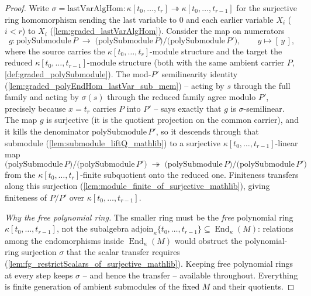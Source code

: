 \begin{proof}
    \leanok
  Write \(\sigma = \mathrm{lastVarAlgHom} : \kappa[t_0, \dots, t_r]
  \twoheadrightarrow \kappa[t_0, \dots, t_{r-1}]\) for the surjective ring
  homomorphism sending the last variable to \(0\) and each earlier variable \(X_i\)
  (\(i < r\)) to \(X_i\) (\cref{lem:graded_lastVarAlgHom}). Consider the map on numerators
  \[
    g : \mathrm{polySubmodule}\,P \;\longrightarrow\;
      \bigl(\mathrm{polySubmodule}\,P\bigr)\big/
        \bigl(\mathrm{polySubmodule}\,P'\bigr), \qquad y \longmapsto [\,y\,],
  \]
  where the source carries the \(\kappa[t_0, \dots, t_r]\)-module structure and the
  target the reduced \(\kappa[t_0, \dots, t_{r-1}]\)-module structure (both with the
  same ambient carrier \(P\), \cref{def:graded_polySubmodule}). The mod-\(P'\)
  semilinearity identity (\cref{lem:graded_polyEndHom_lastVar_sub_mem}) -- acting by
  \(s\) through the full family and acting by \(\sigma(s)\) through the reduced family
  agree modulo \(P'\), precisely because \(x = t_r\) carries \(P\) into \(P'\) --
  says exactly that \(g\) is \(\sigma\)-semilinear. The map \(g\) is surjective (it is
  the quotient projection on the common carrier), and it kills the denominator
  \(\mathrm{polySubmodule}\,P'\), so it descends through that submodule
  (\cref{lem:submodule_liftQ_mathlib}) to a surjective
  \(\kappa[t_0, \dots, t_{r-1}]\)-linear map
  \[
    \bigl(\mathrm{polySubmodule}\,P\bigr)\big/\bigl(\mathrm{polySubmodule}\,P'\bigr)
      \;\twoheadrightarrow\;
    \bigl(\mathrm{polySubmodule}\,P\bigr)\big/\bigl(\mathrm{polySubmodule}\,P'\bigr)
  \]
  from the \(\kappa[t_0, \dots, t_r]\)-finite subquotient onto the reduced one.
  Finiteness transfers along this surjection
  (\cref{lem:module_finite_of_surjective_mathlib}), giving finiteness of \(P/P'\)
  over \(\kappa[t_0, \dots, t_{r-1}]\).

  \emph{Why the free polynomial ring.} The smaller ring must be the \emph{free}
  polynomial ring \(\kappa[t_0, \dots, t_{r-1}]\), not the subalgebra
  \(\mathrm{adjoin}_\kappa\{t_0, \dots, t_{r-1}\} \subseteq
  \operatorname{End}_\kappa(M)\): relations among the endomorphisms inside
  \(\operatorname{End}_\kappa(M)\) would obstruct the polynomial-ring surjection
  \(\sigma\) that the scalar transfer requires
  (\cref{lem:fg_restrictScalars_of_surjective_mathlib}). Keeping free polynomial
  rings at every step keeps \(\sigma\) -- and hence the transfer -- available
  throughout. Everything is finite generation of ambient submodules of the fixed
  \(M\) and their quotients.
\end{proof}

